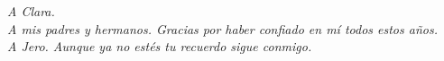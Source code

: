 \begin{center}
\textit{A Clara. }\\
\textit{A mis padres y hermanos. Gracias por haber confiado en mí todos estos años.}\\
\textit{A Jero. Aunque ya no estés tu recuerdo sigue conmigo.}\\
\end{center}
